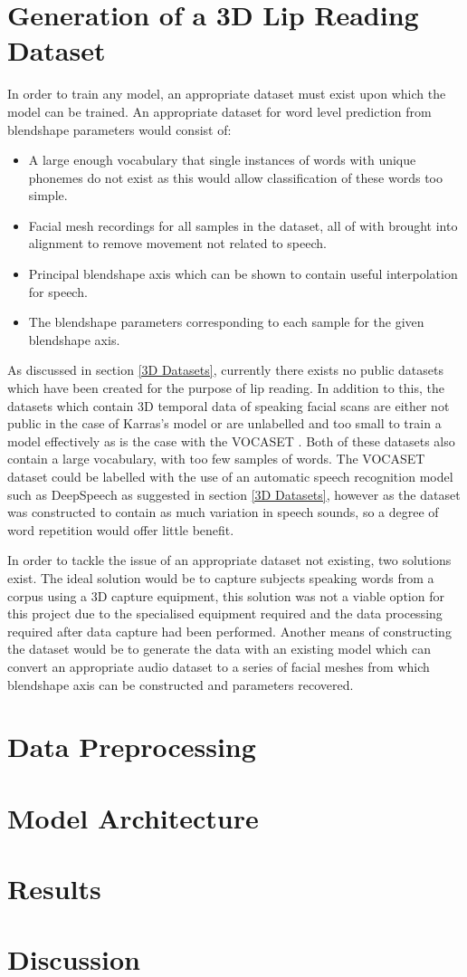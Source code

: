 \section{Generation of a 3D Lip Reading Dataset}
In order to train any model, an appropriate dataset must exist upon which the model can be trained.
An appropriate dataset for word level prediction from blendshape parameters would consist of:
\begin{itemize}
   \item A large enough vocabulary that single instances of words with unique phonemes do not exist as this would allow classification of these words too simple.
   \item Facial mesh recordings for all samples in the dataset, all of with brought into alignment to remove movement not related to speech.
   \item Principal blendshape axis which can be shown to contain useful interpolation for speech.
   \item The blendshape parameters corresponding to each sample for the given blendshape axis.
\end{itemize}

As discussed in section \ref{3D Datasets}, currently there exists no public datasets which have been created for the purpose of lip reading. 
In addition to this, the datasets which contain 3D temporal data of speaking facial scans are either not public in the case of Karras's model \cite{Karras2017a} or are unlabelled and too small to train a model effectively as is the case with the VOCASET \cite{Cudeiro2019}.
Both of these datasets also contain a large vocabulary, with too few samples of words.
The VOCASET dataset could be labelled with the use of an automatic speech recognition model such as DeepSpeech as suggested in section \ref{3D Datasets}, however as the dataset was constructed to contain as much variation in speech sounds, so a degree of word repetition would offer little benefit.

In order to tackle the issue of an appropriate dataset not existing, two solutions exist.
The ideal solution would be to capture subjects speaking words from a corpus using a 3D capture equipment, this solution was not a viable option for this project due to the specialised equipment required and the data processing required after data capture had been performed.
Another means of constructing the dataset would be to generate the data with an existing model which can convert an appropriate audio dataset to a series of facial meshes from which blendshape axis can be constructed and parameters recovered.


\section{Data Preprocessing}

\section{Model Architecture}

\section{Results}

\section{Discussion}

%
%
%